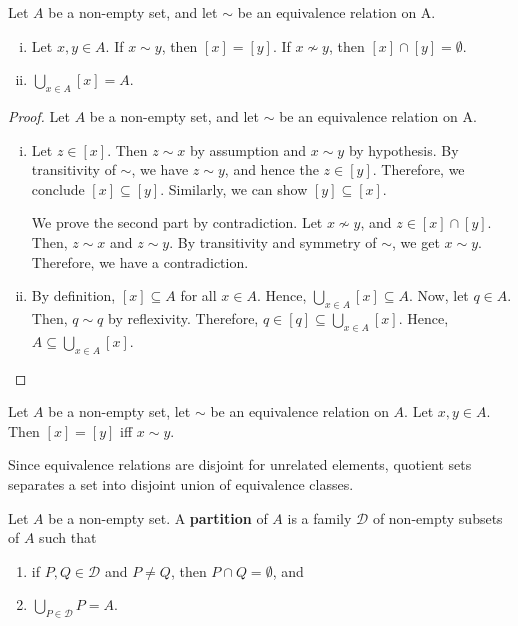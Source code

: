 \documentclass[a4paper,english,12pt]{article}
\begin{document}
\begin{thm}\label{Thm:EqRelPart} Let $A$ be a non-empty set, and let $\sim$ be an equivalence relation on A.
	\begin{enumerate}[i)]
		\item Let $x,y \in A$. If $x \sim y$, then $[x] = [y]$. If $x \nsim y$, then $[x] \cap [y] = \emptyset$.
		\item $\bigcup\limits_{x\in A} [x] = A$.
	\end{enumerate}
\end{thm}
\begin{proof} Let $A$ be a non-empty set, and let $\sim$ be an equivalence relation on A.
	\begin{enumerate}[i)]
		\item Let $z \in [x]$. Then $z \sim x$ by assumption and $x \sim y$ by hypothesis. By transitivity of $\sim$, we have $z \sim y$, and hence the $z \in [y]$. Therefore, we conclude $[x] \subseteq [y]$. Similarly, we can show $[y] \subseteq [x]$. 
		
		We prove the second part by contradiction. Let $x \nsim y$, and $ z \in [x] \cap [y]$. Then, $z \sim x$ and $z \sim y$. By transitivity and symmetry of $\sim$, we get $x \sim y$. Therefore, we have a contradiction.
		\item By definition, $[x] \subseteq A$ for all $x \in A$. Hence, $\bigcup_{x \in A} [x] \subseteq A$. Now, let $q \in A$. Then, $q \sim q$ by reflexivity. Therefore, $q \in [q] \subseteq \bigcup\limits_{x \in A} [x]$. Hence, $A \subseteq \bigcup\limits_{x \in A} [x]$. %
	\end{enumerate}
\end{proof}
\begin{cor} Let $A$ be a non-empty set, let $\sim$ be an equivalence relation on $A$. Let $x, y \in A$. Then $[x] = [y]$ iff $x \sim y$.
\end{cor}
Since equivalence relations are disjoint for unrelated elements, quotient sets separates a set into disjoint union of equivalence classes. 
\begin{defn}[Partition] Let $A$ be a non-empty set. A \textbf{partition} of $A$ is a family $\mathcal{D}$ of non-empty subsets of $A$ such that
	\begin{enumerate}
		\item if $P,Q \in \mathcal{D}$ and $P \neq Q$, then $P \cap Q = \emptyset$, and 
		\item $\bigcup\limits_{P \in \mathcal{D}} P = A$.
	\end{enumerate}	
\end{defn}
\end{document}
